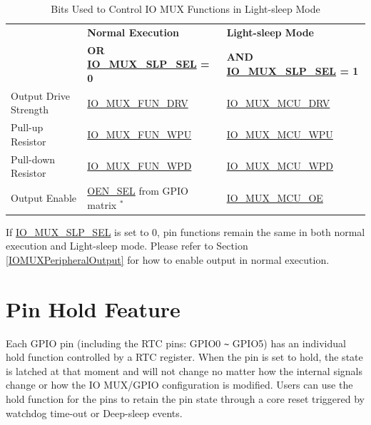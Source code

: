 \documentclass[main\_\_EN.tex]{subfiles}
\begin{document}
\begin{longtable}[c]{|p{3.5cm}|p{4.5cm}|p{4.5cm}|}
\caption{Bits Used to Control IO MUX Functions in Light-sleep Mode}
\label{tab:iomuxgpio-pin-function-register-light-sleep-mode} \\
    \hline
    \rowcolor{lightgray}
   & \textbf{Normal Execution} & \textbf{Light-sleep Mode} \\
    \rowcolor{lightgray}
   \multirow{-2}{*}{\textbf{IO MUX Functions}}  & \textbf{OR \hyperref[fielddesc:IOMUXGPIONSLPSEL]{IO\_MUX\_SLP\_SEL} = 0} & \textbf{AND \hyperref[fielddesc:IOMUXGPIONSLPSEL]{IO\_MUX\_SLP\_SEL} = 1} \\
    \hline
Output Drive Strength & \hyperref[fielddesc:IOMUXGPIONFUNDRV]{IO\_MUX\_FUN\_DRV} & \hyperref[fielddesc:IOMUXGPIONMCUDRV]{IO\_MUX\_MCU\_DRV} \\
\hline
Pull-up Resistor & \hyperref[fielddesc:IOMUXGPIONFUNWPU]{IO\_MUX\_FUN\_WPU} & \hyperref[fielddesc:IOMUXGPIONMCUWPU]{IO\_MUX\_MCU\_WPU} \\
\hline
Pull-down Resistor & \hyperref[fielddesc:IOMUXGPIONFUNWPD]{IO\_MUX\_FUN\_WPD} & \hyperref[fielddesc:IOMUXGPIONMCUWPD]{IO\_MUX\_MCU\_WPD} \\
\hline
Output Enable & \hyperref[fielddesc:GPIOFUNCNOENSEL]{OEN\_SEL} from GPIO matrix $^{*}$  & \hyperref[fielddesc:IOMUXGPIONMCUOE]{IO\_MUX\_MCU\_OE} \\
\hline
\end{longtable}


\begin{tiplisting}
If \hyperref[fielddesc:IOMUXGPIONSLPSEL]{IO\_MUX\_SLP\_SEL} is set to 0, pin functions remain the same in both normal execution and Light-sleep mode. Please refer to Section \ref{IOMUXPeripheralOutput} for how to enable output in normal execution.
\end{tiplisting}


\section{Pin Hold Feature}\label{PadHold}

Each GPIO pin (including the RTC pins: GPIO0 \verb+~+ GPIO5) has an individual hold function controlled by a RTC register. When the pin is set to hold, the state is latched at that moment and will not change no matter how the internal signals change or how the IO MUX/GPIO configuration is modified. Users can use the hold function for the pins to retain the pin state through a core reset triggered by watchdog time-out or Deep-sleep events.
\end{document}
